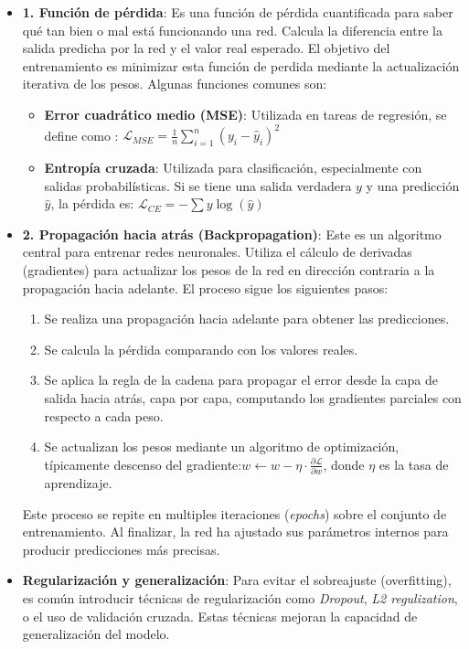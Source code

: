 \documentclass[11pt]{article} %
\begin{document}
\begin{itemize}
\item\textbf{1. Función de pérdida}:\newline
Es una función de pérdida cuantificada para saber qué tan bien o mal está funcionando una red. Calcula la diferencia entre la salida predicha por la red y el valor real esperado. El objetivo del entrenamiento es minimizar esta función de perdida mediante la actualización iterativa de los pesos. \newline Algunas funciones comunes son:
\begin{itemize}
    \item \textbf{Error cuadrático medio (MSE)}: Utilizada en tareas de regresión, se define como : $\mathcal{L}_{MSE} = \frac{1}{n} \sum_{i=1}^{n}(y_i - \hat{y}_i)^2$
    \item \textbf{Entropía cruzada}: Utilizada para clasificación, especialmente con salidas probabilísticas. Si se tiene una salida verdadera $y$ y una predicción $\hat{y}$, la pérdida es: $\mathcal{L}_{CE} = -\sum y \log(\hat{y})$
\end{itemize}

\item\textbf{2. Propagación hacia atrás (Backpropagation)}:\newline
Este es un algoritmo central para entrenar redes neuronales. Utiliza el cálculo de derivadas (gradientes) para actualizar los pesos de la red en dirección contraria a la propagación hacia adelante. El proceso sigue los siguientes pasos:
\begin{enumerate}
    \item Se realiza una propagación hacia adelante para obtener las predicciones.
    \item Se calcula la pérdida comparando con los valores reales.
    \item Se aplica la regla de la cadena para propagar el error desde la capa de salida hacia atrás, capa por capa, computando los gradientes parciales con respecto a cada peso.
    \item Se actualizan los pesos mediante un algoritmo de optimización, típicamente descenso del gradiente:$w \leftarrow w - \eta \cdot \frac{\partial \mathcal{L}}{\partial w}$, donde $\eta$ es la tasa de aprendizaje.
\end{enumerate}
Este proceso se repite en multiples iteraciones (\textit{epochs}) sobre el conjunto de entrenamiento. Al finalizar, la red ha ajustado sus parámetros internos para producir predicciones más precisas.

\item \textbf{Regularización y generalización}: \newline
Para evitar el sobreajuste (overfitting), es común introducir técnicas de regularización como \textit{Dropout}, \textit{L2 regulization}, o el uso de validación cruzada. Estas técnicas mejoran la capacidad de generalización del modelo.
\end{itemize}
\end{document}
